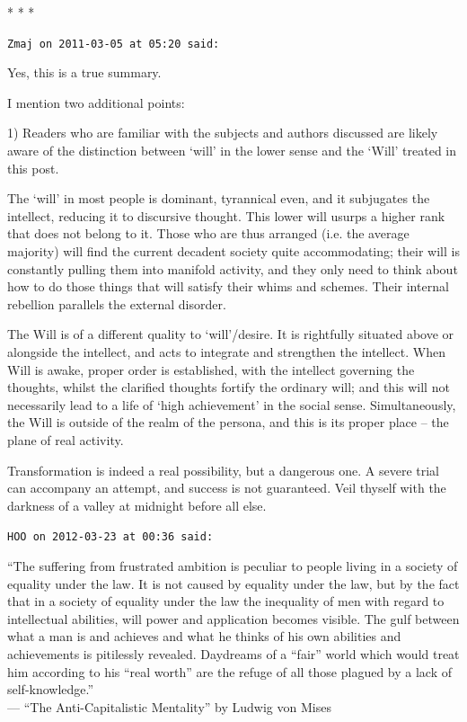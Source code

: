 
\begin{center}* * *\end{center}

\begin{footnotesize}
\begin{sffamily}
\texttt{Zmaj on 2011-03-05 at 05:20 said:}

Yes, this is a true summary.

I mention two additional points:

1) Readers who are familiar with the subjects and authors discussed are likely aware of the distinction between `will' in the lower sense and the `Will' treated in this post.

The `will' in most people is dominant, tyrannical even, and it subjugates the intellect, reducing it to discursive thought. This lower will usurps a higher rank that does not belong to it. Those who are thus arranged (i.e. the average majority) will find the current decadent society quite accommodating; their will is constantly pulling them into manifold activity, and they only need to think about how to do those things that will satisfy their whims and schemes. Their internal rebellion parallels the external disorder.

The Will is of a different quality to `will'/desire. It is rightfully situated above or alongside the intellect, and acts to integrate and strengthen the intellect. When Will is awake, proper order is established, with the intellect governing the thoughts, whilst the clarified thoughts fortify the ordinary will; and this will not necessarily lead to a life of `high achievement' in the social sense. Simultaneously, the Will is outside of the realm of the persona, and this is its proper place -- the plane of real activity.

Transformation is indeed a real possibility, but a dangerous one. A severe trial can accompany an attempt, and success is not guaranteed. Veil thyself with the darkness of a valley at midnight before all else.

\hfill


\texttt{HOO on 2012-03-23 at 00:36 said:}

``The suffering from frustrated ambition is peculiar to people living in a society of equality under the law. It is not caused by equality under the law, but by the fact that in a society of equal\-ity under the law the inequality of men with regard to intellectual abilities, will power and application becomes visible. The gulf between what a man is and achieves and what he thinks of his own abilities and achievements is pitilessly revealed. Day\-dreams of a ``fair'' world which would treat him according to his ``real worth'' are the refuge of all those plagued by a lack of self-knowledge.''\\ --- ``The Anti-Capitalistic Mentality'' by Ludwig von Mises


\end{sffamily}
\end{footnotesize}
